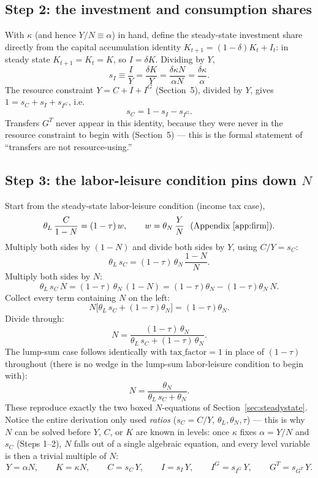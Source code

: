 \documentclass[11pt]{article}
\newcommand{\eq}[1]{\begin{equation}#1\end{equation}}
\begin{document}
\subsection{Step 2: the investment and consumption shares}

With $\kappa$ (and hence $Y/N\equiv\alpha$) in hand, define the
steady-state investment share directly from the capital accumulation
identity $K_{t+1}=(1-\delta)K_t+I_t$: in steady state $K_{t+1}=K_t=K$, so
$I=\delta K$. Dividing by $Y$,
\eq{ s_I \equiv \frac{I}{Y} = \frac{\delta K}{Y} = \frac{\delta\kappa N}{\alpha N} = \frac{\delta\kappa}{\alpha}. }
The resource constraint $Y=C+I+I^G$ (Section~5), divided by $Y$, gives
$1=s_C+s_I+s_{I^G}$, i.e.
\eq{ \boxed{s_C = 1-s_I-s_{I^G}.} }
Transfers $G^T$ never appear in this identity, because they were never in
the resource constraint to begin with (Section~5) --- this is the formal
statement of ``transfers are not resource-using.''

\subsection{Step 3: the labor-leisure condition pins down $N$}

Start from the steady-state labor-leisure condition (income tax case),
\eq{ \theta_L\,\frac{C}{1-N} = (1-\tau)\,w, \qquad w=\theta_N\,\frac{Y}{N}\ \ \text{(Appendix~\ref{app:firm}).} }
Multiply both sides by $(1-N)$ and divide both sides by $Y$, using
$C/Y=s_C$:
\eq{ \theta_L\,s_C = (1-\tau)\,\theta_N\,\frac{1-N}{N}. }
Multiply both sides by $N$:
\eq{ \theta_L\,s_C\,N = (1-\tau)\,\theta_N\,(1-N) = (1-\tau)\theta_N - (1-\tau)\theta_N\,N. }
Collect every term containing $N$ on the left:
\eq{ N\big[\theta_L\,s_C + (1-\tau)\theta_N\big] = (1-\tau)\theta_N. }
Divide through:
\eq{ \boxed{N = \frac{(1-\tau)\,\theta_N}{\theta_L\,s_C+(1-\tau)\,\theta_N}.} }
The lump-sum case follows identically with $\text{tax\_factor}=1$ in place
of $(1-\tau)$ throughout (there is no wedge in the lump-sum labor-leisure
condition to begin with):
\eq{ \boxed{N = \frac{\theta_N}{\theta_L\,s_C+\theta_N}.} }
These reproduce exactly the two boxed $N$-equations of
Section~\ref{sec:steadystate}. Notice the entire derivation only used
\emph{ratios} ($s_C=C/Y$, $\theta_L,\theta_N,\tau$) --- this is why $N$
can be solved before $Y$, $C$, or $K$ are known in levels: once $\kappa$
fixes $\alpha=Y/N$ and $s_C$ (Steps 1--2), $N$ falls out of a single
algebraic equation, and every level variable is then a trivial multiple of
$N$:
\eq{ Y=\alpha N, \qquad K=\kappa N, \qquad C=s_C\,Y, \qquad I=s_I\,Y, \qquad I^G=s_{I^G}\,Y, \qquad G^T=s_{G^T}\,Y. }
\end{document}
